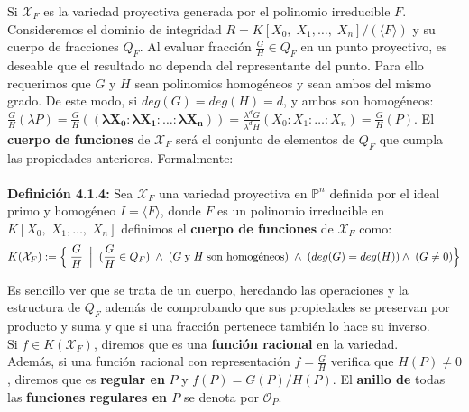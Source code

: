 \documentclass[11pt,spanish]{book}
\begin{document}
Si $\mathbf{\mathcal{X}}_F$ es la variedad proyectiva generada por el polinomio irreducible $F$. Consideremos el dominio de integridad $R=K[X_0,\;X_1,\ldots,\;X_n]/(\langle F\rangle)$ y su cuerpo de fracciones $Q_F$. Al evaluar fracción $\frac{G}{H}\in Q_F$ en un punto proyectivo, es deseable que el resultado no dependa del representante del punto. Para ello requerimos que $G$ y $H$ sean polinomios homogéneos y sean ambos del mismo grado. De este modo, si $deg(G)=deg(H)=d$, y ambos son homogéneos: $\frac{G}{H}(\lambda P)=\frac{G}{H}(\mathbf{(\lambda X_0:\lambda X_1:\ldots:\lambda X_n)})=\frac{\lambda^d G}{\lambda^d H}( X_0: X_1:\ldots:X_n)=\frac{G}{H}(P)$. El \textbf{cuerpo de funciones} de $\mathbf{\mathcal{X}}_{F}$ será el conjunto de elementos de $Q_F$ que cumpla las propiedades anteriores. Formalmente:\\ 
\\ \textbf{Definición 4.1.4: } Sea $\mathbf{\mathcal{X}}_F$ una variedad proyectiva en $\mathbb{P}^n$ definida por el ideal primo y homogéneo $I=\langle F\rangle$, donde $F$ es un polinomio irreducible en $K[X_0,\;X_1,\ldots,\;X_n]$ definimos el \textbf{cuerpo de funciones} de $\mathbf{\mathcal{X}}_{F}$ como:\\ $$K(\mathbf{\mathcal{X}}_F):=\Big{\{}\;\frac{G}{H}\;\;\Big{|}\;\; (\frac{G}{H}\in Q_F)\;\land\;(G\;\text{y}\;H\;\text{son homogéneos})\;\land\;(deg(G)=deg(H))\land\;(G\neq 0)\Big{\}}$$

Es sencillo ver que se trata de un cuerpo, heredando las operaciones y la estructura de $Q_F$ además de comprobando que sus propiedades se preservan por producto y suma y que si una fracción pertenece también lo hace su inverso.\\

Si $f\in K(\mathbf{\mathcal{X}}_F)$, diremos que es una \textbf{función racional} en la variedad.\\ 
Además, si una función racional con representación $f=\frac{G}{H}$ verifica que $H(P)\neq 0$, diremos que es \textbf{regular en} $P$ y $f(P)=G(P)/H(P)$. El \textbf{anillo de} todas las \textbf{funciones regulares en $P$} se denota por $\mathcal{O}_P$.\\
\end{document}
